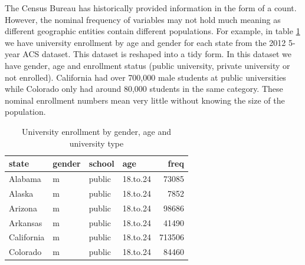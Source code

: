 \documentclass{article}\usepackage[]{graphicx}\usepackage[]{color}
\begin{document}
The Census Bureau has historically provided information in the form of a count.  However, the nominal frequency of variables may not hold much meaning as different geographic entities contain different populations.  For example, in table \ref{tab:freq} we have university enrollment by age and gender for each state from the 2012 5-year ACS dataset.  This dataset is reshaped into a tidy form.  In this dataset we have gender, age and enrollment status (public university, private university or not enrolled).  California had over 700,000 male students at public universities while Colorado only had around 80,000 students in the same category.  These nominal enrollment numbers mean very little without knowing the size of the population.\\
\begin{table}[ht]
\centering
\begin{tabular}{llllr}
  \hline
state & gender & school & age & freq \\ 
  \hline
Alabama & m & public & 18.to.24 & 73085 \\ 
  Alaska & m & public & 18.to.24 & 7852 \\ 
  Arizona & m & public & 18.to.24 & 98686 \\ 
  Arkansas & m & public & 18.to.24 & 41490 \\ 
  California & m & public & 18.to.24 & 713506 \\ 
  Colorado & m & public & 18.to.24 & 84460 \\ 
   \hline
\end{tabular}
\caption{University enrollment by gender, age and university type} 
\label{tab:freq}
\end{table}
\end{document}

